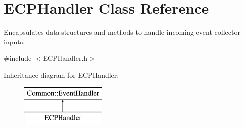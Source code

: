 \hypertarget{class_e_c_p_handler}{\section{E\-C\-P\-Handler Class Reference}
\label{class_e_c_p_handler}
}


Encapsulates data structures and methods to handle incoming event collector inputs.  




{\ttfamily \#include $<$E\-C\-P\-Handler.\-h$>$}

Inheritance diagram for E\-C\-P\-Handler\-:\begin{figure}[H]
\begin{center}
\leavevmode
\includegraphics[height=2.000000cm]{class_e_c_p_handler}
\end{center}
\end{figure}
